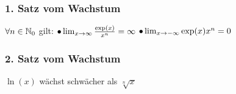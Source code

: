 \subsubsection*{1. Satz vom Wachstum}
$\forall n \in \mathbb N_{0}$ gilt:
    $\bullet \lim_{x \rightarrow \infty} \frac{\exp(x)}{x^n} = \infty$
    $\bullet \lim_{x \rightarrow - \infty} \exp(x) x^n = 0$
\subsubsection*{2. Satz vom Wachstum}
$\ln(x)$ wächst schwächer als $\sqrt[n]{x}$

